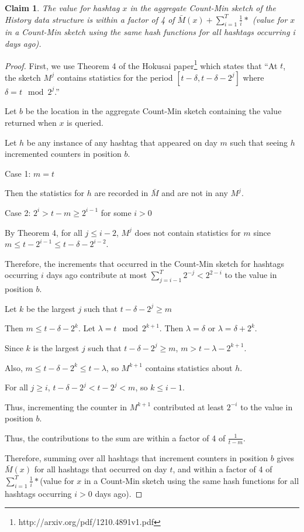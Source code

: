 \documentclass[twoside]{article}
\newtheorem{claim}{Claim}
\begin{document}
\begin{claim}
The value for hashtag $x$ in the aggregate Count-Min sketch of the History data structure is within a factor of 4 of $\bar{M}(x) + \sum\limits_{i=1}^T \frac{1}{i}*$ (value for $x$ in a Count-Min sketch using the same hash functions for all hashtags occurring i days ago).
\end{claim}
\begin{proof}
First, we use Theorem 4 of the Hokusai paper\footnote{http://arxiv.org/pdf/1210.4891v1.pdf} which states that ``At $t$, the sketch $M^j$ contains statistics for the period $[t - \delta, t - \delta - 2^j]$ where $\delta = t \mod 2^j$.''

Let $b$ be the location in the aggregate Count-Min sketch containing the value returned when $x$ is queried.

Let $h$ be any instance of any hashtag that appeared on day $m$ such that seeing $h$ incremented counters in position $b$.

Case 1: $m=t$

Then the statistics for $h$ are recorded in $\bar{M}$ and are not in any $M^j$.

Case 2: $2^i > t-m \geq 2^{i-1}$ for some $i > 0$

By Theorem 4, for all $j \leq i - 2$, $M^j$ does not contain statistics for $m$ since $m \leq t - 2^{i-1} \leq t - \delta - 2^{i-2}$.

Therefore, the increments that occurred in the Count-Min sketch for hashtags occurring $i$ days ago contribute at most $\sum\limits_{j = i - 1}^{T} 2^{-j} < 2^{2-i}$ to the value in position $b$.

Let $k$ be the largest $j$ such that $t - \delta - 2^j \geq m$

Then $m \leq t - \delta - 2^k$.  Let $\lambda = t \mod 2^{k+1}$.  Then $\lambda = \delta$ or $\lambda = \delta + 2^k$.

Since $k$ is the largest $j$ such that $t - \delta - 2^j \geq m$, $m > t - \lambda - 2^{k+1}$.

Also, $m \leq t - \delta - 2^k \leq t - \lambda$, so $M^{k+1}$ contains statistics about $h$.

For all $j \geq i$, $t - \delta - 2^j < t - 2^j < m$, so $k \leq i - 1$. 

Thus, incrementing the counter in $M^{k + 1}$ contributed at least $2^{-i}$ to the value in position $b$.

Thus, the contributions to the sum are within a factor of 4 of $\frac{1}{t-m}$.

Therefore, summing over all hashtags that increment counters in position $b$ gives $\bar{M}(x)$ for all hashtags that occurred on day $t$, and within a factor of 4 of $\sum\limits_{i=1}^T \frac{1}{i}*$(value for $x$ in a Count-Min sketch using the same hash functions for all hashtags occurring $i > 0$ days ago). 
\end{proof}
\end{document}
